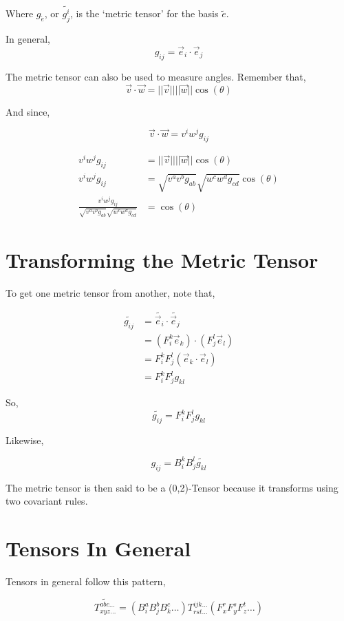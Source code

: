 \documentclass[12pt]{book}
\theoremstyle{plain}
\theoremstyle{definition}
\theoremstyle{ppart}
\theoremstyle{case}
\theoremstyle{solution}
\begin{document}
Where $g_{\widetilde{e}}$, or $\widetilde{g^i_j}$, is the `metric tensor' for the basis $\widetilde{e}$.

In general,
\label{metric_tensor}
\[ g_{ij} = \vec{e}_i \cdot \vec{e}_j \]

The metric tensor can also be used to measure angles.
Remember that,
\[ \vec{v} \cdot \vec{w} = ||\vec{v}|| ||\vec{w}||\cos(\theta) \]

And since,

\label{dot}
\[ \vec{v} \cdot \vec{w} =  v^i w^j g_{ij} \]

\label{angle}
\begin{align*}
  v^i w^j g_{ij} &= ||\vec{v}|| ||\vec{w}||\cos(\theta) \\
  v^i w^j g_{ij} &= \sqrt{v^a v^b g_{ab}} \sqrt{w^c w^d g_{cd}} \cos(\theta) \\
  \frac{v^i w^j g_{ij}}{\sqrt{v^a v^b g_{ab}} \sqrt{w^c w^d g_{cd}}} &=  \cos(\theta)
\end{align*}

\section{Transforming the Metric Tensor}

To get one metric tensor from another, note that, 

\begin{align*}
  \widetilde{g_{ij}}
  &= \widetilde{\vec{e}_i} \cdot \widetilde{\vec{e}_j} \\
  &= (F^k_i\vec{e}_k) \cdot (F^l_j\vec{e}_l) \\
  &= F^k_i F^l_j (\vec{e}_k \cdot \vec{e}_l) \\
  &= F^k_i F^l_j g_{kl}
\end{align*}

\label{metric_tensor_transform}
So,
\[ \widetilde{g_{ij}} = F^k_i F^l_j g_{kl} \]

Likewise,

\[ g_{ij} = B^k_i B^l_j \widetilde{g_{kl}} \]

The metric tensor is then said to be a (0,2)-Tensor because it transforms using
two covariant rules.

\section{Tensors In General}

Tensors in general follow this pattern,
\label{general_tensor}

\[
  \widetilde{T^{abc\dots}_{xyz\dots}}
  =
  (B^a_i B^b_j B^c_k \dots) 
  T^{ijk\dots}_{rst\dots}
  (F^r_x F^s_y F^t_z \dots) 
\]
\end{document}
